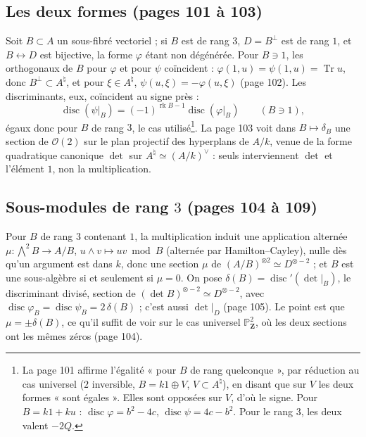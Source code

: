 \documentclass[11pt,a4paper]{article}
\begin{document}
\subsection*{Les deux formes (pages 101 à 103)}

Soit $B \subset A$ un sous-fibré vectoriel ; si $B$ est de rang $3$, $D =
B^{\perp}$ est de rang $1$, et $B \leftrightarrow D$ est bijective, la forme
$\varphi$ étant non dégénérée. Pour $B \ni 1$, les orthogonaux de $B$ pour
$\varphi$ et pour $\psi$ coïncident : $\varphi(1, u) = \psi(1, u) =
\operatorname{Tr}u$, donc $B^{\perp} \subset A^{\natural}$, et pour $\xi \in
A^{\natural}$, $\psi(u, \xi) = -\varphi(u, \xi)$ (page 102). Les discriminants,
eux, coïncident au signe près :
\[
  \operatorname{disc}(\psi|_B) = (-1)^{\operatorname{rk}B - 1}\operatorname{disc}(\varphi|_B)
  \qquad (B \ni 1),
\]
égaux donc pour $B$ de rang $3$, le cas utilisé\footnote{La page 101 affirme
l'égalité « pour $B$ de rang quelconque », par réduction au cas universel
($2$ inversible, $B = k1 \oplus V$, $V \subset A^{\natural}$), en disant que
sur $V$ les deux formes « sont égales ». Elles sont opposées sur $V$, d'où le
signe. Pour $B = k1 + ku$ : $\operatorname{disc}\varphi = b^2 - 4c$,
$\operatorname{disc}\psi = 4c - b^2$. Pour le rang $3$, les deux valent $-2Q$.}.
La page 103 voit dans $B \mapsto \delta_B$ une section de
$\mathcal{O}(2)$ sur le plan projectif des hyperplans de $A/k$, venue de la forme
quadratique canonique $\det$ sur $A^{\natural} \simeq (A/k)^{\vee}$ : seuls
interviennent $\det$ et l'élément $1$, non la multiplication.

\subsection*{Sous-modules de rang $3$ (pages 104 à 109)}

Pour $B$ de rang $3$ contenant $1$, la multiplication induit une application
alternée $\mu : \bigwedge^2 B \to A/B$, $u \wedge v \mapsto uv \bmod B$ (alternée
par Hamilton--Cayley), nulle dès qu'un argument est dans $k$, donc une section
$\mu$ de $(A/B)^{\otimes 2} \simeq D^{\otimes -2}$ ; et $B$ est une sous-algèbre
si et seulement si $\mu = 0$. On pose $\delta(B) = \operatorname{disc}'(\det|_B)$,
le discriminant divisé, section de $(\det B)^{\otimes -2} \simeq
D^{\otimes -2}$, avec $\operatorname{disc}\varphi_B =
\operatorname{disc}\psi_B = 2\,\delta(B)$ ; c'est aussi $\det|_D$ (page 105).
Le point est que $\mu = \pm\delta(B)$, ce qu'il suffit de voir sur le cas
universel $\mathbb{P}^2_{\mathbf{Z}}$, où les deux sections ont les mêmes zéros
(page 104).
\end{document}
